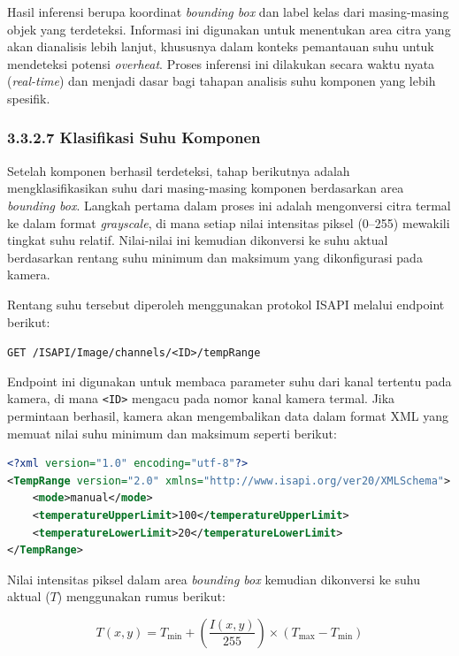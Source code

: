 Hasil inferensi berupa koordinat \emph{bounding box} dan label kelas dari masing-masing objek yang terdeteksi. Informasi ini digunakan untuk menentukan area citra yang akan dianalisis lebih lanjut, khususnya dalam konteks pemantauan suhu untuk mendeteksi potensi \emph{overheat}. Proses inferensi ini dilakukan secara waktu nyata (\emph{real-time}) dan menjadi dasar bagi tahapan analisis suhu komponen yang lebih spesifik.

\subsubsection{3.3.2.7 Klasifikasi Suhu Komponen}

Setelah komponen berhasil terdeteksi, tahap berikutnya adalah mengklasifikasikan suhu dari masing-masing komponen berdasarkan area \emph{bounding box}. Langkah pertama dalam proses ini adalah mengonversi citra termal ke dalam format \emph{grayscale}, di mana setiap nilai intensitas piksel (0--255) mewakili tingkat suhu relatif. Nilai-nilai ini kemudian dikonversi ke suhu aktual berdasarkan rentang suhu minimum dan maksimum yang dikonfigurasi pada kamera.

Rentang suhu tersebut diperoleh menggunakan protokol ISAPI melalui endpoint berikut:

\begin{center}
\texttt{GET /ISAPI/Image/channels/<ID>/tempRange}
\end{center}

Endpoint ini digunakan untuk membaca parameter suhu dari kanal tertentu pada kamera, di mana \texttt{<ID>} mengacu pada nomor kanal kamera termal. Jika permintaan berhasil, kamera akan mengembalikan data dalam format XML yang memuat nilai suhu minimum dan maksimum seperti berikut:

\begin{lstlisting}[language=XML]
<?xml version="1.0" encoding="utf-8"?>
<TempRange version="2.0" xmlns="http://www.isapi.org/ver20/XMLSchema">
    <mode>manual</mode>
    <temperatureUpperLimit>100</temperatureUpperLimit>
    <temperatureLowerLimit>20</temperatureLowerLimit>
</TempRange>
\end{lstlisting}

Nilai intensitas piksel dalam area \emph{bounding box} kemudian dikonversi ke suhu aktual (\(T\)) menggunakan rumus berikut:

\begin{equation}
T(x, y) = T_{\text{min}} + \left( \frac{I(x, y)}{255} \right) \times (T_{\text{max}} - T_{\text{min}})
\label{eq:suhu-piksel}
\end{equation}


